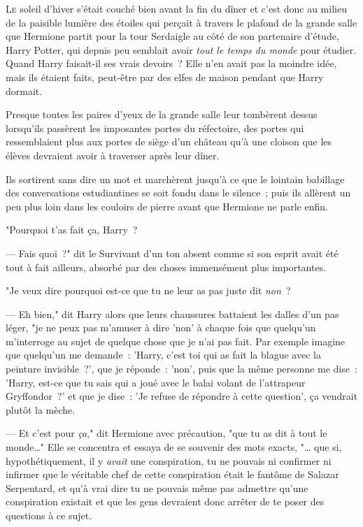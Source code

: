 
\lettrine{L}{e} soleil d'hiver s'était couché bien avant la fin du dîner et c'est donc au milieu de la paisible lumière des étoiles qui perçait à travers le plafond de la grande salle que Hermione partit pour la tour Serdaigle au côté de son partenaire d'étude, Harry Potter, qui depuis peu semblait avoir \emph{tout le temps du monde} pour étudier. Quand Harry faisait-il ses vrais devoirs~? Elle n'en avait pas la moindre idée, mais ils étaient faits, peut-être par des elfes de maison pendant que Harry dormait.

Presque toutes les paires d'yeux de la grande salle leur tombèrent dessus lorsqu'ils passèrent les imposantes portes du réfectoire, des portes qui ressemblaient plus aux portes de siège d'un château qu'à une cloison que les élèves devraient avoir à traverser après leur dîner.

Ils sortirent sans dire un mot et marchèrent jusqu'à ce que le lointain babillage des conversations estudiantines se soit fondu dans le silence~; puis ils allèrent un peu plus loin dans les couloirs de pierre avant que Hermione ne parle enfin.

"Pourquoi t'as fait ça, Harry~?

--- Fais quoi~?" dit le Survivant d'un ton absent comme si son esprit avait été tout à fait ailleurs, absorbé par des choses immensément plus importantes.

"Je veux dire pourquoi est-ce que tu ne leur as pas juste dit \emph{non}~?

--- Eh bien," dit Harry alors que leurs chaussures battaient les dalles d'un pas léger, "je ne peux pas m'amuser à dire 'non' à chaque fois que quelqu'un m'interroge au sujet de quelque chose que je n'ai pas fait. Par exemple imagine que quelqu'un me demande~: 'Harry, c'est toi qui as fait la blague avec la peinture invisible~?', que je réponde~: 'non', puis que la même personne me dise~: 'Harry, est-ce que tu sais qui a joué avec le balai volant de l'attrapeur Gryffondor~?' et que je dise~: 'Je refuse de répondre à cette question', ça vendrait plutôt la mèche.

--- Et c'est pour \emph{ça}," dit Hermione avec précaution, "que tu as dit à tout le monde…" Elle se concentra et essaya de se souvenir des mots exacts, "… que si, hypothétiquement, il y \emph{avait} une conspiration, tu ne pouvais ni confirmer ni infirmer que le véritable chef de cette conspiration était le fantôme de Salazar Serpentard, et qu'à vrai dire tu ne pouvais même pas admettre qu'une conspiration existait et que les gens devraient donc arrêter de te poser des questions à ce sujet.

